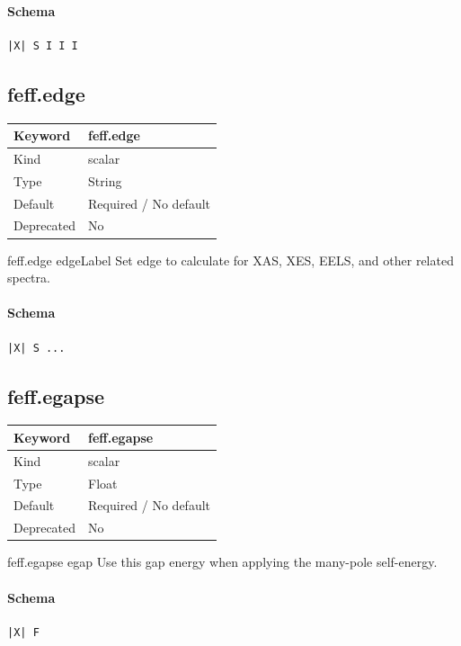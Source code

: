 \documentclass[11pt]{article}
\begin{document}
{{{\paragraph{Schema}
\begin{Verbatim}
|X| S I I I
\end{Verbatim}

\subsection{feff.edge}
\label{kw:feff-edge}
\begin{longtable}{|p{1.5in}|p{4.5in}|}
\hline
Keyword & feff.edge \\
\hline
Kind & scalar \\
\hline
Type & String \\
\hline
Default & Required / No default \\
\hline
Deprecated & No \\
\hline
\end{longtable}
 feff.edge{ edgeLabel }
 Set edge to calculate for XAS, XES, EELS, and other related spectra.

\paragraph{Schema}
\begin{Verbatim}
|X| S ...
\end{Verbatim}

\subsection{feff.egapse}
\label{kw:feff-egapse}
\begin{longtable}{|p{1.5in}|p{4.5in}|}
\hline
Keyword & feff.egapse \\
\hline
Kind & scalar \\
\hline
Type & Float \\
\hline
Default & Required / No default \\
\hline
Deprecated & No \\
\hline
\end{longtable}
 feff.egapse{ egap }
 Use this gap energy when applying the many-pole self-energy.

\paragraph{Schema}
\begin{Verbatim}
|X| F
\end{Verbatim}

}}}
\end{document}
